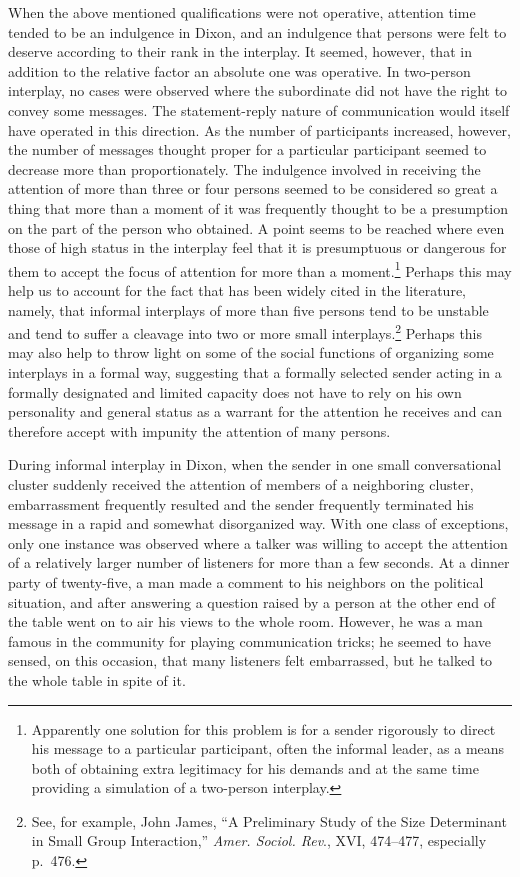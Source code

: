 \documentclass[twoside,symmetric,nobib,justified]{tufte-book}
\begin{document}
When the above mentioned qualifications were not operative, attention
time tended to be an indulgence in Dixon, and an indulgence that persons
were felt to deserve according to their rank in the interplay. It
seemed, however, that in addition to the relative factor an absolute one
was operative. In two-person interplay, no cases were observed where the
subordinate did not have the right to convey some messages. The
statement-reply nature of communication would itself have operated in
this direction. As the number of participants increased, however, the
number of messages thought proper for a particular participant seemed to
decrease more than proportionately. The indulgence involved in receiving
the attention of more than three or four persons seemed to be considered
so great a thing that more than a moment of it was frequently thought to
be a presumption on the part of the person who obtained. A point seems
to be reached where even those of high status in the interplay feel that
it is presumptuous or dangerous for them to accept the focus of
attention for more than a moment.\footnote{Apparently one solution for
  this problem is for a sender rigorously to direct his message to a
  particular participant, often the informal leader, as a means both of
  obtaining extra legitimacy for his demands and at the same time
  providing a simulation of a two-person interplay.} Perhaps this may
help us to account for the fact that has been widely cited in the
literature, namely, that informal interplays of more than five persons
tend to be unstable and tend to suffer a cleavage into two or more small
interplays.\footnote{See, for example, John James, ``A Preliminary Study
  of the Size Determinant in Small Group Interaction,'' \emph{Amer.
  Sociol. Rev}., XVI, 474--477, especially p.~476.} Perhaps this may
also help to throw light on some of the social functions of organizing
some interplays in a formal way, suggesting that a formally selected
sender acting in a formally designated and limited capacity does not
have to rely on his own personality and general status as a warrant for
the attention he receives and can therefore accept with impunity the
attention of many persons.

\enlargethispage{\baselineskip}

During informal interplay in Dixon, when the sender in one small
conversational cluster suddenly received the attention of members of a
neighboring cluster, embarrassment frequently resulted and the sender
frequently terminated his message in a rapid and somewhat disorganized
way. With one class of exceptions, only one instance was observed where
a talker was willing to accept the attention of a relatively larger
number of listeners for more than a few seconds. At a dinner party of
twenty-five, a man made a comment to his neighbors on the political
situation, and after answering a question raised by a person at the
other end of the table went on to air his views to the whole room.
However, he was a man famous in the community for playing communication
tricks; he seemed to have sensed, on this occasion, that many listeners
felt embarrassed, but he talked to the whole table in spite of it.
\end{document}
